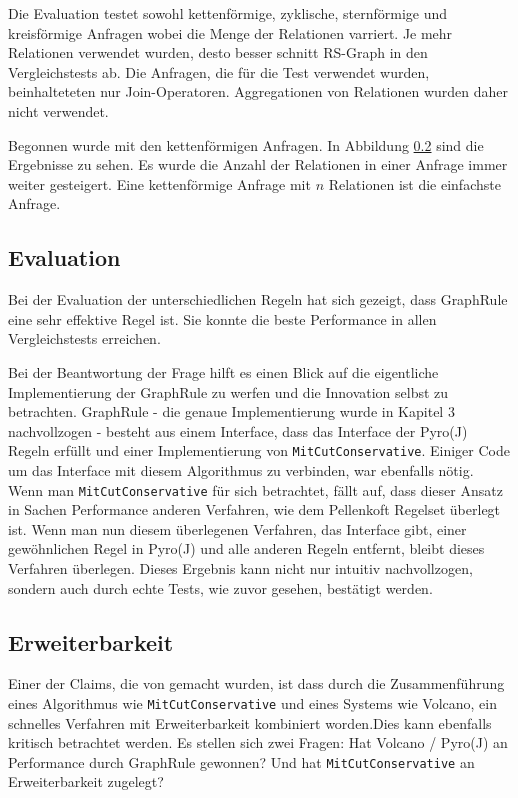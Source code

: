 Die Evaluation testet sowohl kettenförmige, zyklische, sternförmige und kreisförmige Anfragen wobei die Menge der Relationen varriert. Je mehr Relationen verwendet wurden, desto besser schnitt RS-Graph in den Vergleichstests ab. Die Anfragen, die für die Test verwendet wurden, beinhalteteten nur Join-Operatoren. Aggregationen von Relationen wurden daher nicht verwendet.



Begonnen wurde mit den kettenförmigen Anfragen. In Abbildung \ref{} sind die Ergebnisse zu sehen. Es wurde die Anzahl der Relationen in einer Anfrage immer weiter gesteigert. Eine kettenförmige Anfrage mit $n$ Relationen ist die einfachste Anfrage. 

\subsection{Evaluation}

Bei der Evaluation der unterschiedlichen Regeln hat sich gezeigt, dass GraphRule eine sehr effektive Regel ist. Sie konnte die beste Performance in allen Vergleichstests erreichen. 

Bei der Beantwortung der Frage hilft es einen Blick auf die eigentliche Implementierung der GraphRule zu werfen und die Innovation selbst zu betrachten. GraphRule - die genaue Implementierung wurde in Kapitel 3 nachvollzogen - besteht aus einem Interface, dass das Interface der Pyro(J) Regeln erfüllt und einer Implementierung von \texttt{MitCutConservative}. Einiger Code um das Interface mit diesem Algorithmus zu verbinden, war ebenfalls nötig. Wenn man \texttt{MitCutConservative} für sich betrachtet, fällt auf, dass dieser Ansatz in Sachen Performance anderen Verfahren, wie dem Pellenkoft Regelset überlegt ist. Wenn man nun diesem überlegenen Verfahren, das Interface gibt, einer gewöhnlichen Regel in Pyro(J) und alle anderen Regeln entfernt, bleibt dieses Verfahren überlegen. Dieses Ergebnis kann nicht nur intuitiv nachvollzogen, sondern auch durch echte Tests, wie zuvor gesehen, bestätigt werden.


\subsection{Erweiterbarkeit}

Einer der Claims, die von \cite{} gemacht wurden, ist dass durch die Zusammenführung eines Algorithmus wie \texttt{MitCutConservative} und eines Systems wie Volcano, ein schnelles Verfahren mit Erweiterbarkeit kombiniert worden.Dies  kann ebenfalls kritisch betrachtet werden. Es stellen sich zwei Fragen: Hat Volcano / Pyro(J) an Performance durch GraphRule gewonnen? Und hat \texttt{MitCutConservative} an Erweiterbarkeit zugelegt?

